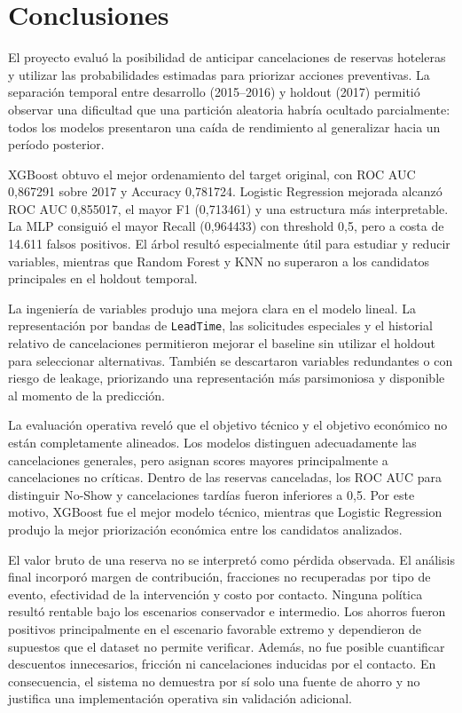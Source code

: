 \section{Conclusiones}

El proyecto evaluó la posibilidad de anticipar cancelaciones de reservas
hoteleras y utilizar las probabilidades estimadas para priorizar acciones
preventivas. La separación temporal entre desarrollo (2015--2016) y holdout
(2017) permitió observar una dificultad que una partición aleatoria habría
ocultado parcialmente: todos los modelos presentaron una caída de rendimiento
al generalizar hacia un período posterior.

XGBoost obtuvo el mejor ordenamiento del target original, con ROC AUC 0,867291
sobre 2017 y Accuracy 0,781724. Logistic Regression mejorada alcanzó ROC AUC
0,855017, el mayor F1 (0,713461) y una estructura más interpretable. La MLP
consiguió el mayor Recall (0,964433) con threshold 0,5, pero a costa de 14.611
falsos positivos. El árbol resultó especialmente útil para estudiar y reducir
variables, mientras que Random Forest y KNN no superaron a los candidatos
principales en el holdout temporal.

La ingeniería de variables produjo una mejora clara en el modelo lineal. La
representación por bandas de \texttt{LeadTime}, las solicitudes especiales y
el historial relativo de cancelaciones permitieron mejorar el baseline sin
utilizar el holdout para seleccionar alternativas. También se descartaron
variables redundantes o con riesgo de leakage, priorizando una representación
más parsimoniosa y disponible al momento de la predicción.

La evaluación operativa reveló que el objetivo técnico y el objetivo económico
no están completamente alineados. Los modelos distinguen adecuadamente las
cancelaciones generales, pero asignan scores mayores principalmente a
cancelaciones no críticas. Dentro de las reservas canceladas, los ROC AUC para
distinguir No-Show y cancelaciones tardías fueron inferiores a 0,5. Por este
motivo, XGBoost fue el mejor modelo técnico, mientras que Logistic Regression
produjo la mejor priorización económica entre los candidatos analizados.

El valor bruto de una reserva no se interpretó como pérdida observada. El
análisis final incorporó margen de contribución, fracciones no recuperadas por
tipo de evento, efectividad de la intervención y costo por contacto. Ninguna
política resultó rentable bajo los escenarios conservador e intermedio. Los
ahorros fueron positivos principalmente en el escenario favorable extremo y
dependieron de supuestos que el dataset no permite verificar. Además, no fue
posible cuantificar descuentos innecesarios, fricción ni cancelaciones
inducidas por el contacto. En consecuencia, el sistema no demuestra por sí
solo una fuente de ahorro y no justifica una implementación operativa sin
validación adicional.


